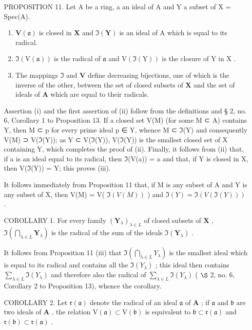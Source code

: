 PROPOSITION 11. Let A be a ring, a an ideal of A and Y a subset of X = Spec(A).

\begin{enumerate}
\def\labelenumi{(\roman{enumi})}
\item
  \(\mathbf{V}(\mathfrak{a})\) is closed in \(\mathbf{X}\) and \(\Im (\mathbf{Y})\) is an ideal of A which is equal to its radical.
\item
  \(\Im(\mathrm{V}(\mathfrak{a}))\) is the radical of \(\mathfrak{a}\) and \(\mathrm{V}(\Im(\mathrm{Y}))\) is the closure of \(\mathrm{Y}\) in \(\mathrm{X}\) .
\item
  The mappings \(\Im\) and \(\mathbf{V}\) define decreasing bijections, one of which is the inverse of the other, between the set of closed subsets of \(\mathbf{X}\) and the set of ideals of \(\mathbf{A}\) which are equal to their radicals.
\end{enumerate}

Assertion (i) and the first assertion of (ii) follow from the definitions and § 2, no. 6, Corollary 1 to Proposition 13. If a closed set V(M) (for some M ⊂ A) contains Y, then M ⊂ p for every prime ideal p ∈ Y, whence M ⊂ \(\mathfrak{I}\)(Y) and consequently V(M) ⊃ V(\(\mathfrak{I}\)(Y)); as Y ⊂ V(\(\mathfrak{I}\)(Y)), V(\(\mathfrak{I}\)(Y)) is the smallest closed set of X containing Y, which completes the proof of (ii). Finally, it follows from (ii) that, if a is an ideal equal to its radical, then \(\mathfrak{I}\)(V(a)) = a and that, if Y is closed in X, then V(\(\mathfrak{I}\)(Y)) = Y; this proves (iii).

It follows immediately from Proposition 11 that, if M is any subset of A and Y is any subset of X, then V(M) = V( \(\Im(V(M))\) ) and \(\Im(Y) = \Im(V(\Im(Y)))\) .

COROLLARY 1. For every family \((\mathbf{Y}_{\lambda})_{\lambda \in L}\) of closed subsets of \(\mathbf{X}\) , \(\Im\left(\bigcap_{\lambda \in L} \mathbf{Y}_{\lambda}\right)\) is the radical of the sum of the ideals \(\Im(\mathbf{Y}_{\lambda})\) .

It follows from Proposition 11 (iii) that \(\Im\left(\bigcap_{\lambda\in L}Y_{\lambda}\right)\) is the smallest ideal which is equal to its radical and contains all the \(\Im(Y_{\lambda})\) ; this ideal then contains \(\sum_{\lambda\in L}\Im(Y_{\lambda})\) and therefore also the radical of \(\sum_{\lambda\in L}\Im(Y_{\lambda})\) ( \(\S\) 2, no. 6, Corollary 2 to Proposition 13), whence the corollary.

COROLLARY 2. Let \(\mathfrak{r}(\mathfrak{a})\) denote the radical of an ideal \(\mathfrak{a}\) of \(\mathbf{A}\) ; if \(\mathfrak{a}\) and \(\mathfrak{b}\) are two ideals of \(\mathbf{A}\) , the relation \(\mathrm{V}(\mathfrak{a}) \subset \mathrm{V}(\mathfrak{b})\) is equivalent to \(\mathfrak{b} \subset \mathfrak{r}(\mathfrak{a})\) and \(\mathfrak{r}(\mathfrak{b}) \subset \mathfrak{r}(\mathfrak{a})\) .


